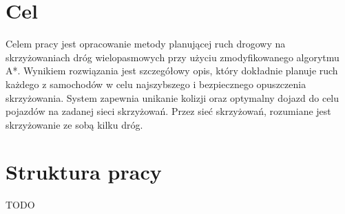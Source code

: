 \section{Cel}

Celem pracy jest opracowanie metody planującej ruch drogowy na skrzyżowaniach dróg wielopasmowych przy użyciu zmodyfikowanego algorytmu A*. 
\newline
\newline
Wynikiem rozwiązania jest szczegółowy opis, który dokładnie planuje ruch każdego z samochodów w celu najszybszego i bezpiecznego opuszczenia skrzyżowania.
\newline
\newline
System zapewnia unikanie kolizji oraz optymalny dojazd do celu pojazdów na zadanej sieci skrzyżowań. Przez sieć skrzyżowań, rozumiane jest skrzyżowanie ze sobą kilku dróg.

\section{Struktura pracy}
TODO
